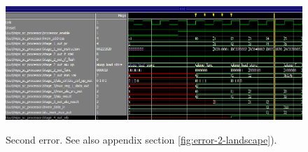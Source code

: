 \begin{figure}[H]
	\caption{Second error. See also appendix section \ref{fig:error-2-landscape}).}
	\includegraphics[scale=0.5]{figures/error_2.png}
	\label{fig:error-2-text}
\end{figure}
